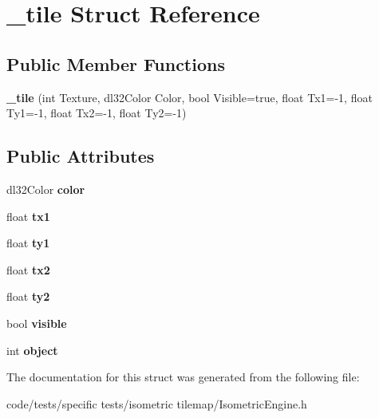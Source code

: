 \hypertarget{struct__tile}{\section{\-\_\-tile Struct Reference}
\label{struct__tile}
}
\subsection*{Public Member Functions}
\begin{DoxyCompactItemize}
\item 
\hypertarget{struct__tile_a63d858615182f4482cb91432d6256084}{{\bfseries \-\_\-tile} (int Texture, dl32\-Color Color, bool Visible=true, float Tx1=-\/1, float Ty1=-\/1, float Tx2=-\/1, float Ty2=-\/1)}\label{struct__tile_a63d858615182f4482cb91432d6256084}

\end{DoxyCompactItemize}
\subsection*{Public Attributes}
\begin{DoxyCompactItemize}
\item 
\hypertarget{struct__tile_a3ad843fffab2488c8fecfa3871e912f9}{dl32\-Color {\bfseries color}}\label{struct__tile_a3ad843fffab2488c8fecfa3871e912f9}

\item 
\hypertarget{struct__tile_a235a28b07ba098fe9c22d38db5f238ea}{float {\bfseries tx1}}\label{struct__tile_a235a28b07ba098fe9c22d38db5f238ea}

\item 
\hypertarget{struct__tile_a3f5b63e94c8a69afc0a346b4b6cbd3bf}{float {\bfseries ty1}}\label{struct__tile_a3f5b63e94c8a69afc0a346b4b6cbd3bf}

\item 
\hypertarget{struct__tile_a0e262e175bc7f207fe2e64bf1654b262}{float {\bfseries tx2}}\label{struct__tile_a0e262e175bc7f207fe2e64bf1654b262}

\item 
\hypertarget{struct__tile_a9fb8b495fd46bdc7a81fe5186417f818}{float {\bfseries ty2}}\label{struct__tile_a9fb8b495fd46bdc7a81fe5186417f818}

\item 
\hypertarget{struct__tile_ab6a1d5cfd33e6b684fcb9463b57a0464}{bool {\bfseries visible}}\label{struct__tile_ab6a1d5cfd33e6b684fcb9463b57a0464}

\item 
\hypertarget{struct__tile_ab904b76775411d68c965e777da111019}{int {\bfseries object}}\label{struct__tile_ab904b76775411d68c965e777da111019}

\end{DoxyCompactItemize}


The documentation for this struct was generated from the following file\-:\begin{DoxyCompactItemize}
\item 
code/tests/specific tests/isometric tilemap/Isometric\-Engine.\-h\end{DoxyCompactItemize}
